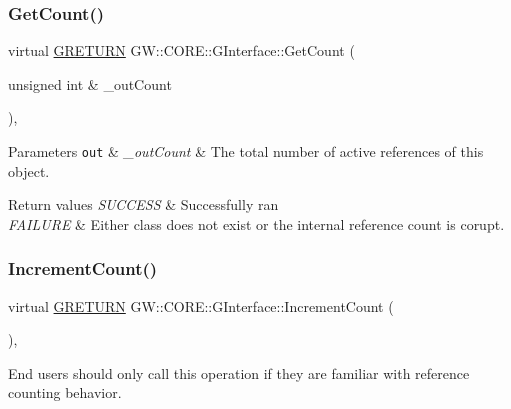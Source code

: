 \subsubsection{\texorpdfstring{Get\+Count()}{GetCount()}}
{\footnotesize\ttfamily virtual \hyperlink{namespace_g_w_a69b1aaebac1cac8049825f035884c95b}{G\+R\+E\+T\+U\+RN} G\+W\+::\+C\+O\+R\+E\+::\+G\+Interface\+::\+Get\+Count (\begin{DoxyParamCaption}\item[{unsigned int \&}]{\+\_\+out\+Count }\end{DoxyParamCaption})\hspace{0.3cm}{\ttfamily [pure virtual]}, {\ttfamily [inherited]}}


\begin{DoxyParams}[1]{Parameters}
\mbox{\tt out}  & {\em \+\_\+out\+Count} & The total number of active references of this object.\\
\hline
\end{DoxyParams}

\begin{DoxyRetVals}{Return values}
{\em S\+U\+C\+C\+E\+SS} & Successfully ran \\
\hline
{\em F\+A\+I\+L\+U\+RE} & Either class does not exist or the internal reference count is corupt. \\
\hline
\end{DoxyRetVals}
\hypertarget{class_g_w_1_1_c_o_r_e_1_1_g_interface_a3e04e58eef4f3e3f56ff7fb751194c37}{}\label{class_g_w_1_1_c_o_r_e_1_1_g_interface_a3e04e58eef4f3e3f56ff7fb751194c37} 
\subsubsection{\texorpdfstring{Increment\+Count()}{IncrementCount()}}
{\footnotesize\ttfamily virtual \hyperlink{namespace_g_w_a69b1aaebac1cac8049825f035884c95b}{G\+R\+E\+T\+U\+RN} G\+W\+::\+C\+O\+R\+E\+::\+G\+Interface\+::\+Increment\+Count (\begin{DoxyParamCaption}{ }\end{DoxyParamCaption})\hspace{0.3cm}{\ttfamily [pure virtual]}, {\ttfamily [inherited]}}

End users should only call this operation if they are familiar with reference counting behavior.


